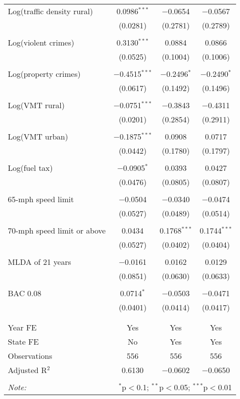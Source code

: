 \begin{table}[!htbp]
\begin{tabular}{@{\extracolsep{5pt}}lccc}
 Log(traffic density rural) & 0.0986$^{***}$ & $-$0.0654 & $-$0.0567 \\ 
  & (0.0281) & (0.2781) & (0.2789) \\ 
  & & & \\ 
 Log(violent crimes) & 0.3130$^{***}$ & 0.0884 & 0.0866 \\ 
  & (0.0525) & (0.1004) & (0.1006) \\ 
  & & & \\ 
 Log(property crimes) & $-$0.4515$^{***}$ & $-$0.2496$^{*}$ & $-$0.2490$^{*}$ \\ 
  & (0.0617) & (0.1492) & (0.1496) \\ 
  & & & \\ 
 Log(VMT rural) & $-$0.0751$^{***}$ & $-$0.3843 & $-$0.4311 \\ 
  & (0.0201) & (0.2854) & (0.2911) \\ 
  & & & \\ 
 Log(VMT urban) & $-$0.1875$^{***}$ & 0.0908 & 0.0717 \\ 
  & (0.0442) & (0.1780) & (0.1797) \\ 
  & & & \\ 
 Log(fuel tax) & $-$0.0905$^{*}$ & 0.0393 & 0.0427 \\ 
  & (0.0476) & (0.0805) & (0.0807) \\ 
  & & & \\ 
 65-mph speed limit & $-$0.0504 & $-$0.0340 & $-$0.0474 \\ 
  & (0.0527) & (0.0489) & (0.0514) \\ 
  & & & \\ 
 70-mph speed limit or above & 0.0434 & 0.1768$^{***}$ & 0.1744$^{***}$ \\ 
  & (0.0527) & (0.0402) & (0.0404) \\ 
  & & & \\ 
 MLDA of 21 years & $-$0.0161 & 0.0162 & 0.0129 \\ 
  & (0.0851) & (0.0630) & (0.0633) \\ 
  & & & \\ 
 BAC 0.08 & 0.0714$^{*}$ & $-$0.0503 & $-$0.0471 \\ 
  & (0.0401) & (0.0414) & (0.0417) \\ 
  & & & \\ 
\hline \\[-1.8ex] 
Year FE & Yes & Yes & Yes \\ 
State FE & No & Yes & Yes \\ 
Observations & 556 & 556 & 556 \\ 
Adjusted R$^{2}$ & 0.6130 & $-$0.0602 & $-$0.0650 \\ 
\hline 
\hline \\[-1.8ex] 
\textit{Note:}  & \multicolumn{3}{r}{$^{*}$p$<$0.1; $^{**}$p$<$0.05; $^{***}$p$<$0.01} \\ 
\end{tabular} 
\end{table} 
